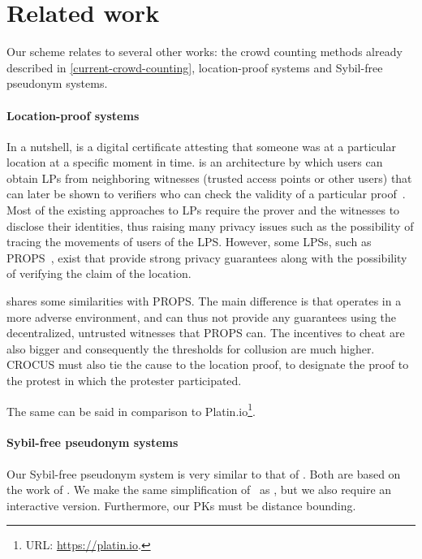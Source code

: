 \section{Related work}

Our scheme relates to several other works: the crowd counting methods already 
described in \cref{current-crowd-counting}, location-proof systems and 
Sybil-free pseudonym systems.

\paragraph*{Location-proof systems}%
\label{db-and-lp}

In a nutshell,  is a digital certificate attesting that someone was at 
a particular location at a specific moment in time.
 is an architecture by which users can obtain \acp{LP} from 
neighboring witnesses (\eg trusted access points or other users) that can later 
be shown to verifiers who can check the validity of a particular 
proof~\cite{luo2010veriplace,zhu2011applaus}.
Most of the existing approaches to \acp{LP} require the prover and the 
witnesses to disclose their identities, thus raising many privacy issues such 
as the possibility of tracing the movements of users of the \ac{LPS}.
However, some \acp{LPS}, such as PROPS~\cite{PROPS}, exist that provide strong 
privacy guarantees along with the possibility of verifying the claim of the 
location.

\CROCUS shares some similarities with PROPS\@.
The main difference is that \CROCUS operates in a more adverse environment, and 
can thus not provide any guarantees using the decentralized, untrusted 
witnesses that PROPS can.
The incentives to cheat are also bigger and consequently the thresholds for 
collusion are much higher.
CROCUS must also tie the cause to the location proof, to designate the proof to 
the protest in which the protester participated.

The same can be said in comparison to Platin.io\footnote{%
  URL: \url{https://platin.io}.
}.

\paragraph*{Sybil-free pseudonym systems}

Our Sybil-free pseudonym system is very similar to that of 
\textcite{SybilFreePseudonyms}.
Both are based on the work of \textcite{HowToWinTheCloneWars}.
We make the same simplification of~\cite{HowToWinTheCloneWars} as 
\textcite{SybilFreePseudonyms}, but we also require an interactive version.
Furthermore, our \acp{PK} must be distance bounding.
